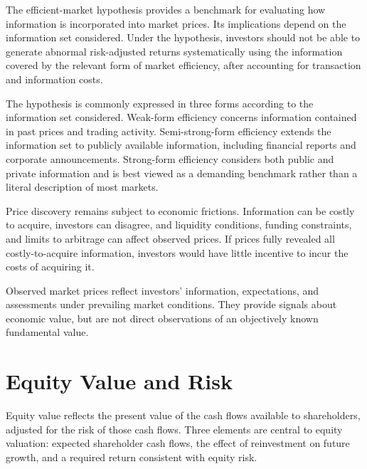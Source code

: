 The efficient-market hypothesis provides a benchmark
for evaluating how information is incorporated into
market prices. Its implications depend on the
information set considered. Under the hypothesis,
investors should not be able to generate abnormal
risk-adjusted returns systematically using the
information covered by the relevant form of market
efficiency, after accounting for transaction and
information costs.

The hypothesis is commonly expressed in three forms according to the information set considered. Weak-form efficiency concerns information contained in past prices and trading activity. Semi-strong-form efficiency extends the information set to publicly available information, including financial reports and corporate announcements. Strong-form efficiency considers both public and private information and is best viewed as a demanding benchmark rather than a literal description of most markets.

Price discovery remains subject to economic frictions. Information can be costly to acquire, investors can disagree, and liquidity conditions, funding constraints, and limits to arbitrage can affect observed prices. If prices fully revealed all costly-to-acquire
information, investors would have little incentive
to incur the costs of acquiring it.

\begin{tcolorbox}[
  enhanced,
  breakable,
  colback=white,
  colframe=FinanceBlue,
  boxrule=0.7pt,
  sharp corners,
  borderline west={2.2pt}{0pt}{FinanceBlue},
  title=\textbf{Financial Perspective: Price Discovery Is Not Perfect Valuation},
  coltitle=white,
  colbacktitle=FinanceBlue,
  fonttitle=\bfseries,
  before skip=1.2em,
  after skip=1.2em
]

Observed market prices reflect investors' information,
expectations, and assessments under prevailing market
conditions. They provide signals about economic value,
but are not direct observations of an objectively
known fundamental value.

\end{tcolorbox}

\section{Equity Value and Risk}

Equity value reflects the present value of the cash flows available to shareholders, adjusted for the risk of those cash flows. Three elements are central to equity valuation: expected shareholder cash flows, the effect of reinvestment on future growth, and a required return consistent with equity risk.

